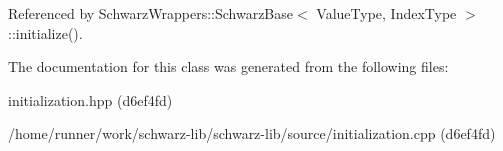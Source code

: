 Referenced by Schwarz\+Wrappers\+::\+Schwarz\+Base$<$ Value\+Type, Index\+Type $>$\+::initialize().



The documentation for this class was generated from the following files\+:\begin{DoxyCompactItemize}
\item 
initialization.\+hpp (d6ef4fd)\item 
/home/runner/work/schwarz-\/lib/schwarz-\/lib/source/initialization.\+cpp (d6ef4fd)\end{DoxyCompactItemize}
